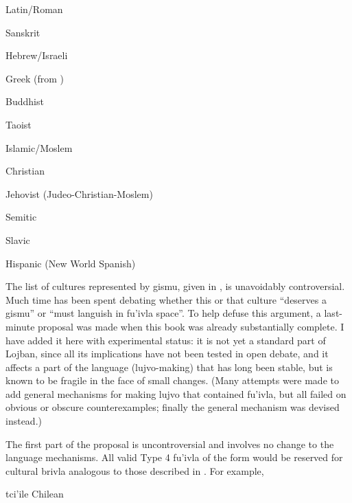 \begin{description}
\item[latmo]{Latin/Roman}
\item[srito]{Sanskrit}
\item[xebro]{Hebrew/Israeli}
\item[xelso]{Greek (from )}
\end{description}

\begin{description}
\item[budjo]{Buddhist}
\item[dadjo]{Taoist}
\item[muslo]{Islamic/Moslem}
\item[xriso]{Christian}
\end{description}

\begin{description}
\item[jegvo]{Jehovist (Judeo-Christian-Moslem)}
\item[semto]{Semitic}
\item[slovo]{Slavic}
\item[xispo]{Hispanic (New World Spanish)}
\end{description}



The list of cultures represented by gismu, given in , is unavoidably controversial. Much time has been spent debating whether this or that culture ``deserves a gismu'' or ``must languish in fu'ivla space''. To help defuse this argument, a last-minute proposal was made when this book was already substantially complete. I have added it here with experimental status: it is not yet a standard part of Lojban, since all its implications have not been tested in open debate, and it affects a part of the language (lujvo-making) that has long been stable, but is known to be fragile in the face of small changes. (Many attempts were made to add general mechanisms for making lujvo that contained fu'ivla, but all failed on obvious or obscure counterexamples; finally the general  mechanism was devised instead.)

The first part of the proposal is uncontroversial and involves no change to the language mechanisms. All valid Type 4 fu'ivla of the form  would be reserved for cultural brivla analogous to those described in . For example,
\begin{example}
tci'ile\n
Chilean
\end{example}


